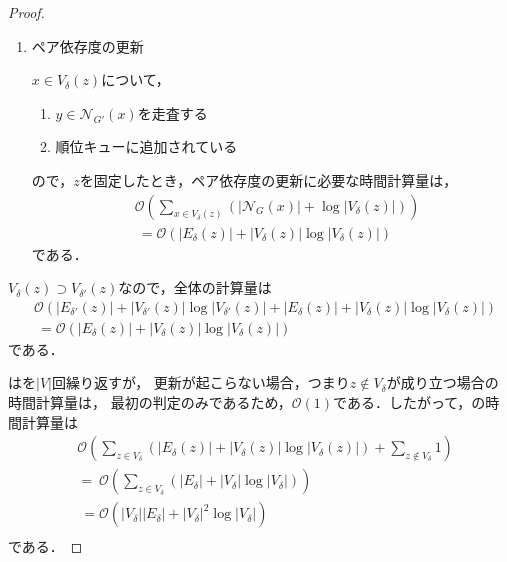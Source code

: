 \begin{proof}
\begin{enumerate}[label=(\alph*)]
  \item ペア依存度の更新
    \par $x\in V_\delta(z)$について，
    \begin{enumerate}[label=\arabic*.]
    \item $y\in\mathcal{N}_{G'}(x)$を走査する
    \item 順位キューに追加されている
    \end{enumerate}
    ので，$z$を固定したとき，ペア依存度の更新に必要な時間計算量は，
    \begin{equation}
      \begin{aligned}
        &\mathcal{O}(\sum_{x\in V_\delta(z)}(\lvert\mathcal{N}_G(x)\rvert
        +\log\lvert V_\delta(z)\rvert)) \nonumber\\
        &\:=\mathcal{O}(\lvert E_\delta(z)\rvert
        +\lvert V_\delta(z)\rvert\log\lvert V_\delta(z)\rvert) \nonumber
      \end{aligned}
    \end{equation}
    である．
  \end{enumerate}
  
  $V_\delta(z)\supset V_{\delta'}(z)$なので，全体の計算量は
  \begin{equation*}
    \begin{aligned}
      &\mathcal{O}(
        \lvert E_{\delta'}(z)\rvert+\lvert V_{\delta'}(z)\rvert\log\lvert V_{\delta'}(z)\rvert
        +\lvert E_\delta(z)\rvert+\lvert V_\delta(z)\rvert\log\lvert V_\delta(z)\rvert
      ) \nonumber\\
      &\:=\mathcal{O}(\lvert E_\delta(z)\rvert+\lvert V_\delta(z)\rvert\log\lvert V_\delta(z)\rvert)
    \end{aligned}
  \end{equation*}
  である．

  はを$\lvert V\rvert$回繰り返すが，
  更新が起こらない場合，つまり$z\notin V_\delta$が成り立つ場合の時間計算量は，
  最初の判定のみであるため，$\mathcal{O}(1)$である．したがって，の時間計算量は
  \begin{equation*}
    \begin{aligned}
      &\mathcal{O}(
      \sum_{z\in V_\delta}(\lvert E_\delta(z)\rvert+\lvert V_\delta(z)\rvert\log\lvert V_\delta(z)\rvert)
      +\sum_{z\notin V_\delta}1) \nonumber\\
      &=\:\mathcal{O}(\sum_{z\in V_\delta}(\lvert E_\delta\rvert
      +\lvert V_\delta\rvert\log\lvert V_\delta\rvert))\nonumber\\
      &\:=\mathcal{O}(\lvert V_\delta\rvert\lvert E_\delta\rvert
      +\lvert V_\delta\rvert^2\log\lvert V_\delta\rvert) \nonumber\\
    \end{aligned}
  \end{equation*}
  である．
\end{proof}

